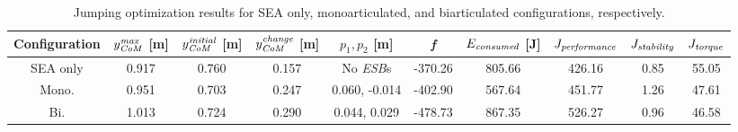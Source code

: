 \documentclass[letterpaper, 10 pt, conference]{ieeeconf}  %
\begin{document}
	\begin{table}[ht]
		\caption{Jumping optimization results for SEA only, monoarticulated, and biarticulated configurations, respectively.}
		\label{table:maxheight}
		\begin{center}
			\begin{tabular}[t]{c|c|c|c|c|c|c|c|c|c}
				Configuration &  $y_{\text{\textit{CoM}}}^{\text{\textit{max}}}$ [m] & $y_{\text{\textit{CoM}}}^{\text{\textit{initial}}}$ [m]& $y_{\text{\textit{CoM}}}^{\text{\textit{change}}}$ [m]& $p_1,p_2$ [m] & \textit{f} & $E_{\text{\textit{consumed}}}$ [J] & $J_{\text{\textit{performance}}}$ & $J_{\text{\textit{stability}}}$ & $J_{\text{\textit{torque}}}$ \\ 
				\hline
				SEA only	& 0.917 & 0.760 & 0.157 & No \textit{ESB}s	& -370.26 & 805.66 & 426.16 & 0.85 & 55.05\\
				\hline
				Mono.		& 0.951 & 0.703 & 0.247 & 0.060, -0.014	& -402.90 & 567.64 & 451.77 & 1.26 & 47.61 \\
				\hline
				Bi.			& 1.013 & 0.724 & 0.290 & 0.044, 0.029		& -478.73 & 867.35 & 526.27 & 0.96 & 46.58
			\end{tabular}
		\end{center}
	\end{table}
	
\end{document}
